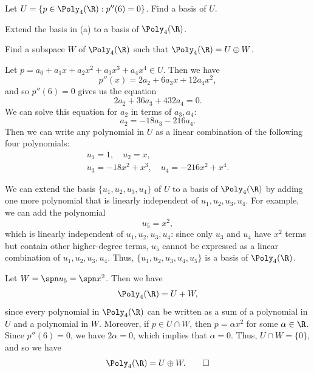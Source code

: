 \begin{exercise}\leavevmode
\begin{parts}
\item Let $U=\{p\in\Poly_4(\R) : p''(6)=0\}$. Find a basis of $U$.
\item Extend the basis in (a) to a basis of $\Poly_4(\R)$.
\item Find a subspace $W$ of $\Poly_4(\R)$ such that $\Poly_4(\R)=U\oplus W$.
\end{parts}
\end{exercise}
\begin{solution}
\begin{parts}
\item Let $p=a_0+a_1x+a_2x^2+a_3x^3+a_4x^4\in U$. Then we have
  \[ p''(x) = 2a_2+6a_3x+12a_4x^2, \]
  and so $p''(6)=0$ gives us the equation
  \[ 2a_2+36a_3+432a_4 = 0. \]
  We can solve this equation for $a_2$ in terms of $a_3,a_4$:
  \[ a_2 = -18a_3-216a_4. \]
  Then we can write any polynomial in $U$ as a linear combination of the
  following four polynomials:
  \begin{gather*}
  u_1=1, \quad u_2=x,\\
  u_3=-18x^2+x^3, \quad u_4=-216x^2+x^4.
  \end{gather*}
\item We can extend the basis $\{u_1,u_2,u_3,u_4\}$ of $U$ to a basis of
  $\Poly_4(\R)$ by adding one more polynomial that is linearly independent of
  $u_1,u_2,u_3,u_4$. For example, we can add the polynomial
  \[ u_5 = x^2, \]
  which is linearly independent of $u_1,u_2,u_3,u_4$: since only $u_3$ and
  $u_4$ have $x^2$ terms but contain other higher-degree terms, $u_5$ cannot be
  expressed as a linear combination of $u_1,u_2,u_3,u_4$. Thus,
  $\{u_1,u_2,u_3,u_4,u_5\}$ is a basis of $\Poly_4(\R)$.
\item Let $W=\spn u_5=\spn x^2$. Then we have
  \[ \Poly_4(\R) = U+W, \]
  since every polynomial in $\Poly_4(\R)$ can be written as a sum of a
  polynomial in $U$ and a polynomial in $W$. Moreover, if $p\in U\cap W$, then
  $p=\alpha x^2$ for some $\alpha\in\R$. Since $p''(6)=0$, we have $2\alpha=0$,
  which implies that $\alpha=0$. Thus, $U\cap W=\{0\}$, and so we have
  \[ \Poly_4(\R) = U\oplus W. \qedhere \]
\end{parts}
\end{solution}


